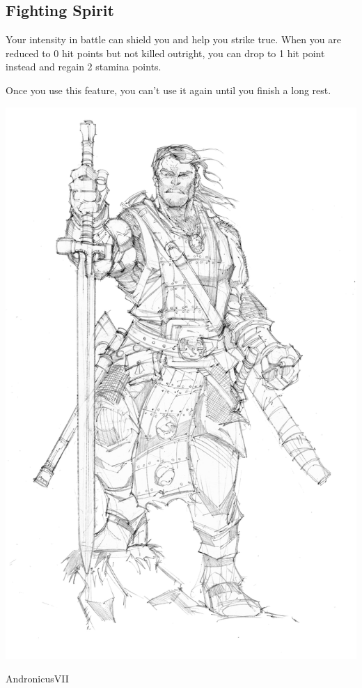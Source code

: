 \begin{multicols*}{2}
\subsection*{Fighting Spirit}

Your intensity in battle can shield you and help you strike true. 
When you are reduced to 0 hit points but not killed outright, you can drop to 1 hit point instead and regain 2 stamina points.

Once you use this feature, you can’t use it again until you finish a long rest.

\begin{Figure}
\centering
\includegraphics[width=\textwidth]{img/fighter.png}
 
AndronicusVII
\end{Figure}

\end{multicols*}    

